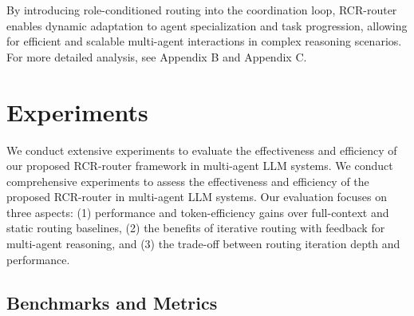 \documentclass[letterpaper]{article} %
\begin{document}
By introducing role-conditioned routing into the coordination loop, RCR-router enables dynamic adaptation to agent specialization and task progression, allowing for efficient and scalable multi-agent interactions in complex reasoning scenarios. For more detailed analysis, see Appendix B and Appendix C.%

\section{Experiments}
\label{sec:experiment} 
We conduct extensive experiments to evaluate the effectiveness and efficiency of our proposed RCR-router framework in multi-agent LLM systems. 
We conduct comprehensive experiments to assess the effectiveness and efficiency of the proposed RCR-router in multi-agent LLM systems. Our evaluation focuses on three aspects: (1) performance and token-efficiency gains over full-context and static routing baselines, (2) the benefits of iterative routing with feedback for multi-agent reasoning, and (3) the trade-off between routing iteration depth and performance.



\subsection{Benchmarks and Metrics}
\end{document}

